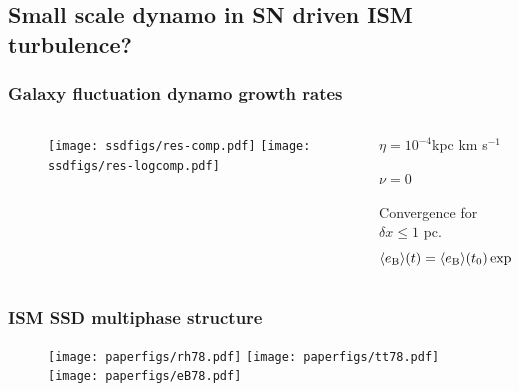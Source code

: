 \documentclass{beamer}
\newcommand\barg{{\overline{\gamma}}}
\newcommand\eB{{\langle e_{\rm B}\rangle}}
\begin{document}
  \subsection{Small scale dynamo in SN driven ISM turbulence?} 
    \begin{frame}
      \frametitle{Galaxy fluctuation dynamo growth rates}
    \begin{columns}
      \begin{column}[]{6.0cm}
       \begin{figure}
        \texttt{[image: ssdfigs/res-comp.pdf]}
        \texttt{[image: ssdfigs/res-logcomp.pdf]}
       \end{figure}
      \end{column}
      \begin{column}[]{5.8cm}
	       \begin{center}
            $\eta=10^{-4}$kpc km s$^{-1}$\vspace{0.5cm}
	    
$\nu=0$\vspace{0.5cm} 

Convergence for $\delta x\leq 1$ pc.\vspace{1cm} 
\begin{equation}\label{eq:barg}
\eB(t)=\eB(t_0)\exp[\barg(t-t_0)].
\end{equation}
	       \end{center}
      \end{column}
      \end{columns}
    \end{frame}
    \begin{frame}
      \frametitle{ISM SSD multiphase structure}
       \begin{figure}
        \texttt{[image: paperfigs/rh78.pdf]}
        \texttt{[image: paperfigs/tt78.pdf]}
        \texttt{[image: paperfigs/eB78.pdf]}
       \end{figure}

    \end{frame}
\end{document}
